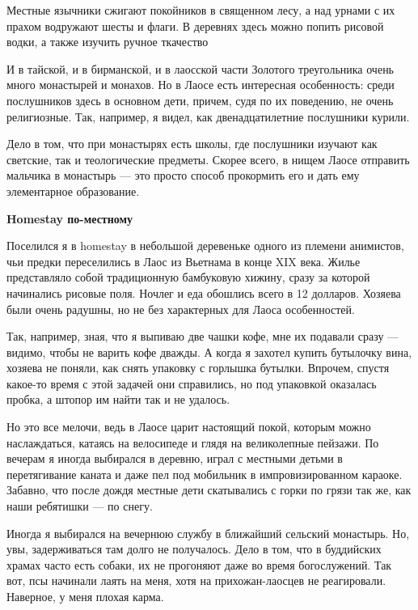 \begin{fancyquotes}
    Местные язычники сжигают покойников в священном лесу, а над урнами с их прахом водружают шесты и флаги. В деревнях здесь можно попить рисовой водки, а также изучить ручное ткачество
\end{fancyquotes}

И в тайской, и в бирманской, и в лаосской части Золотого треугольника очень много монастырей и монахов. Но в Лаосе есть интересная особенность: среди послушников здесь в основном дети, причем, судя по их поведению, не очень религиозные. Так, например, я видел, как двенадцатилетние послушники курили.

Дело в том, что при монастырях есть школы, где послушники изучают как светские, так и теологические предметы. Скорее всего, в нищем Лаосе отправить мальчика в монастырь — это просто способ прокормить его и дать ему элементарное образование.

\textbf{Homestay по-местному}

Поселился я в homestay в небольшой деревеньке одного из племени анимистов, чьи предки переселились в Лаос из Вьетнама в конце XIX века. Жилье представляло собой традиционную бамбуковую хижину, сразу за которой начинались рисовые поля. Ночлег и еда обошлись всего в 12 долларов. Хозяева были очень радушны, но не без характерных для Лаоса особенностей.

Так, например, зная, что я выпиваю две чашки кофе, мне их подавали сразу — видимо, чтобы не варить кофе дважды. А когда я захотел купить бутылочку вина, хозяева не поняли, как снять упаковку с горлышка бутылки. Впрочем, спустя какое-то время с этой задачей они справились, но под упаковкой оказалась пробка, а штопор им найти так и не удалось.

Но это все мелочи, ведь в Лаосе царит настоящий покой, которым можно наслаждаться, катаясь на велосипеде и глядя на великолепные пейзажи. По вечерам я иногда выбирался в деревню, играл с местными детьми в перетягивание каната и даже пел под мобильник в импровизированном караоке. Забавно, что после дождя местные дети скатывались с горки по грязи так же, как наши ребятишки — по снегу.

Иногда я выбирался на вечернюю службу в ближайший сельский монастырь. Но, увы, задерживаться там долго не получалось. Дело в том, что в буддийских храмах часто есть собаки, их не прогоняют даже во время богослужений. Так вот, псы начинали лаять на меня, хотя на прихожан-лаосцев не реагировали. Наверное, у меня плохая карма.

